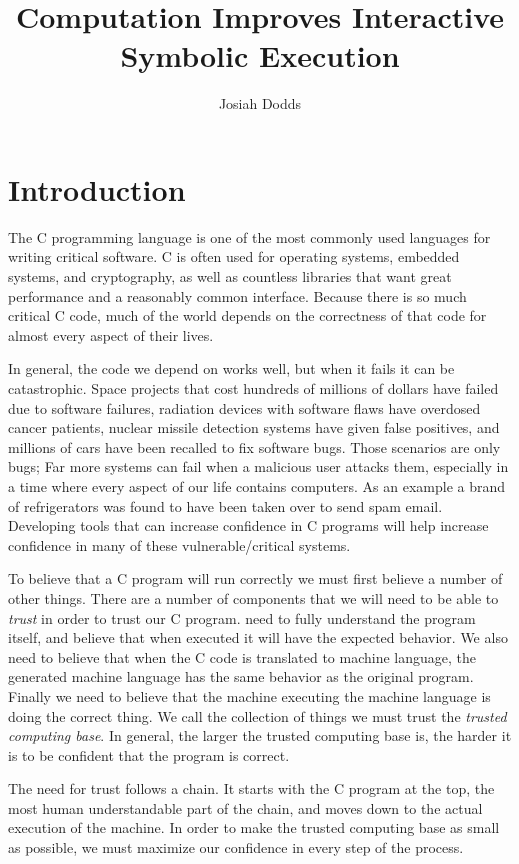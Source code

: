 \documentclass{puthesis}
\author{Josiah Dodds}
\title{Computation Improves Interactive Symbolic Execution}
\begin{document}
\chapter{Introduction}

The C programming language is one of the most commonly used languages
for writing critical software. C is often used for
operating systems, embedded systems, and cryptography, as well as
countless libraries that want great performance and a reasonably
common interface. Because there is so much critical C code, much of
the world depends on the correctness of that code for almost every
aspect of their lives. 

In general, the code we depend on works well, but when it fails it can
be catastrophic. Space projects that cost hundreds of millions of
dollars have failed due to software failures, radiation devices with
software flaws have overdosed cancer patients, nuclear missile
detection systems have given false positives, and millions of cars have
been recalled to fix software bugs. Those scenarios are only bugs; Far
more systems can fail when a malicious user attacks them, especially
in a time where every aspect of our life contains computers. As an
example a brand of refrigerators was found to have been taken over to
send spam email. Developing tools that can increase confidence in C
programs will help increase confidence in many of these
vulnerable/critical systems.

To believe that a C program will run correctly we must first believe a number
of other things. There are a number of components that we will need
to be able to \emph{trust} in order to trust our C program. need to
fully understand the program itself, and believe that when executed it
will have the expected behavior. We also need to
believe that when the C code is translated to machine language, the
generated machine language has the same behavior as the original
program. Finally we need to believe that the machine executing the
machine language is doing the correct thing. We call the collection of
things we must trust the \emph{trusted computing base}. In general,
the larger the trusted computing base is, the harder it is to be
confident that the program is correct.

The need for trust follows a chain. It starts with the C program at
the top, the most human understandable part of the chain, and moves
down to the actual execution of the machine. In order to make the
trusted computing base as small as possible, we must maximize our
confidence in every step of the process.
\end{document}
